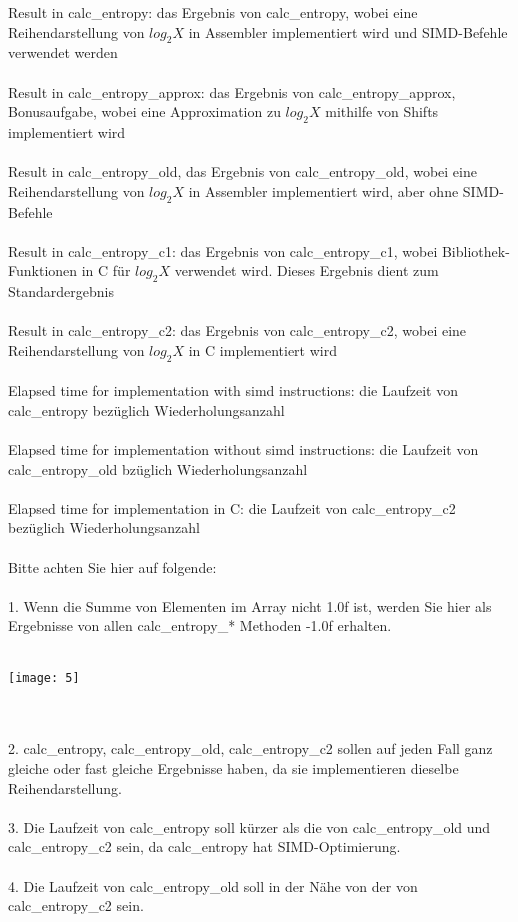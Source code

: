 \documentclass[11pt]{article}
\begin{document}
Result in calc\_entropy: das Ergebnis von calc\_entropy, wobei eine Reihendarstellung von $log_2{X}$ in Assembler implementiert wird und SIMD-Befehle verwendet werden\\\\
Result in calc\_entropy\_approx: das Ergebnis von calc\_entropy\_approx, Bonusaufgabe, wobei eine Approximation zu $log_2{X}$  mithilfe von Shifts implementiert wird\\\\
Result in calc\_entropy\_old, das Ergebnis von calc\_entropy\_old, wobei eine Reihendarstellung von $log_2{X}$  in Assembler implementiert wird, aber ohne SIMD-Befehle\\\\
Result in calc\_entropy\_c1: das Ergebnis von calc\_entropy\_c1, wobei Bibliothek-Funktionen in C f\"ur $log_2{X}$  verwendet wird. Dieses Ergebnis dient zum Standardergebnis\\\\
Result in calc\_entropy\_c2: das Ergebnis von calc\_entropy\_c2, wobei eine Reihendarstellung von $log_2{X}$  in C implementiert wird\\\\
Elapsed time for implementation with simd instructions: die Laufzeit von calc\_entropy bez\"uglich Wiederholungsanzahl\\\\
Elapsed time for implementation without simd instructions: die Laufzeit von calc\_entropy\_old bz\"uglich Wiederholungsanzahl\\\\
Elapsed time for implementation in C: die Laufzeit von calc\_entropy\_c2 bez\"uglich Wiederholungsanzahl\\\\
Bitte achten Sie hier auf folgende:\\\\
{\LARGE 1.}	Wenn die Summe von Elementen im Array nicht 1.0f ist, werden Sie hier als Ergebnisse von allen calc\_entropy\_* Methoden -1.0f erhalten. \\\\
\centerline{\texttt{[image: 5]}}\\\\
{\LARGE 2.}	calc\_entropy, calc\_entropy\_old, calc\_entropy\_c2 sollen auf jeden Fall ganz gleiche oder fast gleiche Ergebnisse haben, da sie implementieren dieselbe Reihendarstellung.\\\\
{\LARGE 3.}	Die Laufzeit von calc\_entropy soll k\"urzer als die von calc\_entropy\_old und calc\_entropy\_c2 sein, da calc\_entropy hat SIMD-Optimierung.\\\\
{\LARGE 4.}	Die Laufzeit von calc\_entropy\_old soll in der N\"ahe von der von calc\_entropy\_c2 sein.\\\\\\
\end{document}
